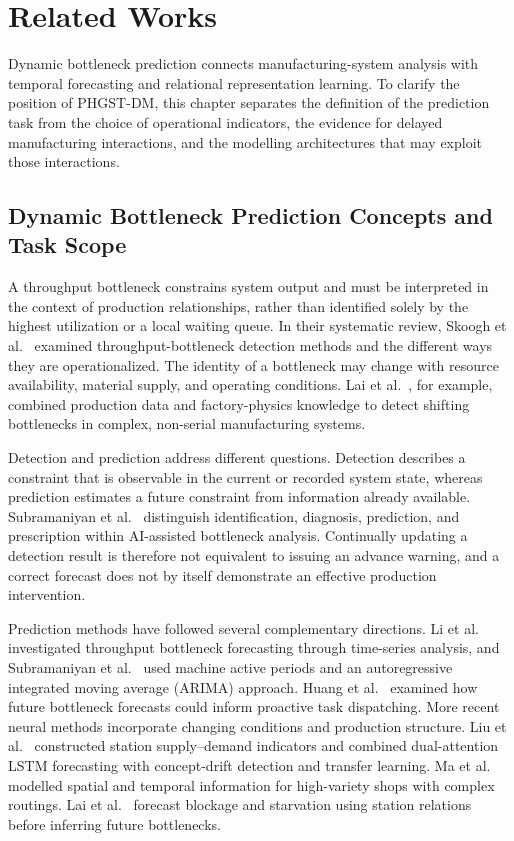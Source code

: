 \chapter{Related Works}\label{ch:related}

Dynamic bottleneck prediction connects manufacturing-system analysis with temporal forecasting and relational representation learning. To clarify the position of PHGST-DM, this chapter separates the definition of the prediction task from the choice of operational indicators, the evidence for delayed manufacturing interactions, and the modelling architectures that may exploit those interactions.

\section{Dynamic Bottleneck Prediction Concepts and Task Scope}\label{dynamic-bottleneck-prediction-concepts-and-task-scope}

A throughput bottleneck constrains system output and must be interpreted in the context of production relationships, rather than identified solely by the highest utilization or a local waiting queue. In their systematic review, Skoogh et al.~\cite{subramaniyan2023throughput} examined throughput-bottleneck detection methods and the different ways they are operationalized. The identity of a bottleneck may change with resource availability, material supply, and operating conditions. Lai et al.~\cite{lai2021data}, for example, combined production data and factory-physics knowledge to detect shifting bottlenecks in complex, non-serial manufacturing systems.

Detection and prediction address different questions. Detection describes a constraint that is observable in the current or recorded system state, whereas prediction estimates a future constraint from information already available. Subramaniyan et al.~\cite{subramaniyan2021ai} distinguish identification, diagnosis, prediction, and prescription within AI-assisted bottleneck analysis. Continually updating a detection result is therefore not equivalent to issuing an advance warning, and a correct forecast does not by itself demonstrate an effective production intervention.

Prediction methods have followed several complementary directions. Li et al.~\cite{li2011throughput} investigated throughput bottleneck forecasting through time-series analysis, and Subramaniyan et al.~\cite{subramaniyan2018data} used machine active periods and an autoregressive integrated moving average (ARIMA) approach. Huang et al.~\cite{huang2019proactive} examined how future bottleneck forecasts could inform proactive task dispatching. More recent neural methods incorporate changing conditions and production structure. Liu et al.~\cite{liu2023lstmdam} constructed station supply--demand indicators and combined dual-attention LSTM forecasting with concept-drift detection and transfer learning. Ma et al.~\cite{ma2023tusb} modelled spatial and temporal information for high-variety shops with complex routings. Lai et al.~\cite{lai2023bstan} forecast blockage and starvation using station relations before inferring future bottlenecks.

